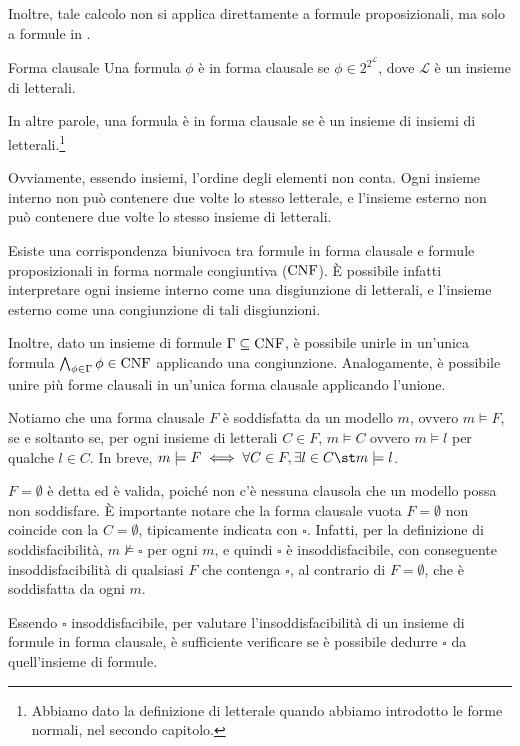 Inoltre, tale calcolo non si applica direttamente a formule proposizionali, ma solo a formule in .

\begin{definition}{Forma clausale}
  Una formula \(\phi\) è in forma clausale se \(\phi \in 2^{2^\mathcal{L}}\), dove \(\mathcal{L}\) è un insieme di letterali.

  In altre parole, una formula è in forma clausale se è un insieme di insiemi di letterali.\footnote{Abbiamo dato la definizione di letterale quando abbiamo introdotto le forme normali, nel secondo capitolo.}
\end{definition}

Ovviamente, essendo insiemi, l'ordine degli elementi non conta. 
Ogni insieme interno non può contenere due volte lo stesso letterale, e l'insieme esterno non può contenere due volte lo stesso insieme di letterali.

Esiste una corrispondenza biunivoca tra formule in forma clausale e formule proposizionali in forma normale congiuntiva (\(\operatorname{CNF}\)). 
È possibile infatti interpretare ogni insieme interno come una disgiunzione di letterali, e l'insieme esterno come una congiunzione di tali disgiunzioni.

Inoltre, dato un insieme di formule \(\Gamma\subseteq\operatorname{CNF}\), è possibile unirle in un'unica formula \(\bigwedge_{\phi\in\Gamma}\phi \in \operatorname{CNF}\) applicando una congiunzione. Analogamente, è possibile unire più forme clausali in un'unica forma clausale applicando l'unione. 

Notiamo che una forma clausale \(F\) è soddisfatta da un modello \(m\), ovvero \(m\models F\), se e soltanto se, per ogni insieme di letterali \(C \in F\), \(m\models C\) ovvero \(m\models l\) per qualche \(l \in C\).
In breve, \(m\models F \iff \forall C \in F ,\exists l \in C\st m\models l\). 

\(F = \emptyset\) è detta  ed è valida, poiché non c'è nessuna clausola che un modello possa non soddisfare.
È importante notare che la forma clausale vuota \(F=\emptyset\) non coincide con la  \(C=\emptyset\), tipicamente indicata con \(\square\). 
Infatti, per la definizione di soddisfacibilità, \(m\not\models \square\) per ogni \(m\), e quindi \(\square\) è insoddisfacibile, con conseguente insoddisfacibilità di qualsiasi \(F\) che contenga \(\square\), al contrario di \(F=\emptyset\), che è soddisfatta da ogni \(m\).

Essendo \(\square\) insoddisfacibile, per valutare l'insoddisfacibilità di un insieme di formule in forma clausale, è sufficiente verificare se è possibile dedurre \(\square\) da quell'insieme di formule.

